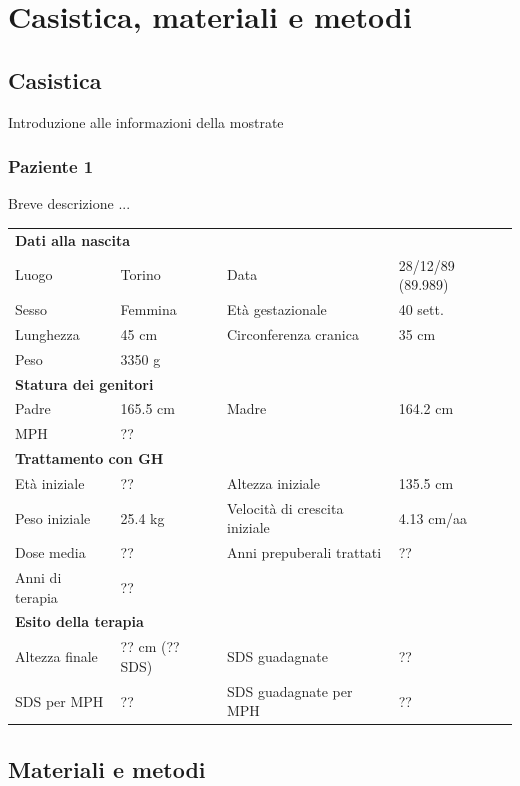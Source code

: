 \chapter{Casistica, materiali e metodi}

\section{Casistica}

Introduzione alle informazioni della mostrate

\subsection{Paziente 1} %

Breve descrizione ...

\begin{table}
\begin{tabular}{ll ll}
\toprule
\multicolumn{4}{l}{\textbf{Dati alla nascita}}\\
Luogo 		& Torino 	& Data 					& 28/12/89 (89.989)\\
Sesso 		& Femmina 	& Età gestazionale 		& 40 sett.\\
Lunghezza 	& 45 cm 	& Circonferenza cranica	& 35 cm\\
Peso 		& 3350 g\\
\midrule
\multicolumn{4}{l}{\textbf{Statura dei genitori}}\\
Padre 		& 165.5 cm 	& Madre 				& 164.2 cm \\
MPH 		& ?? \\
\midrule
\multicolumn{4}{l}{\textbf{Trattamento con GH}} \\
Età	iniziale	& ?? 		& Altezza iniziale 				& 135.5 cm  \\
Peso iniziale	& 25.4 kg	& Velocità di crescita iniziale & 4.13 cm/aa\\
Dose media		& ?? 		& Anni prepuberali trattati		& ??\\
Anni di terapia & ??\\
\midrule
\multicolumn{4}{l}{\textbf{Esito della terapia}} \\
Altezza finale	& ?? cm (?? SDS) & SDS guadagnate 			& ??\\
SDS per MPH		& ??			 & SDS guadagnate per MPH	& ??
\bottomrule
\end{tabular}
\end{table}

\section{Materiali e metodi}

